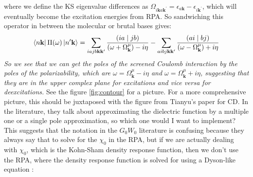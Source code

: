 \documentclass[12pt]{article}
\begin{document}
where we define the KS eigenvalue differences as \(\Omega_{i\mathbf{k}a\mathbf{k}^{\prime}} = \epsilon_{a\mathbf{k}} - \epsilon_{i\mathbf{k}^{\prime}}\), which will eventually become the excitation energies from RPA. So sandwiching this operator in between the molecular or brutal bases gives:
\begin{equation}
    \bra{n\mathbf{k}} \Pi (\omega) \ket{n^\prime\mathbf{k}} = \sum_{iajb \mathbf{k} \mathbf{k}^{\prime}} \frac{(ia\mid jb)}{(\omega + \Omega ^{\mu}_{\mathbf{k}})-i\eta} - \sum_{aibj \mathbf{k} \mathbf{k}^{\prime}} \frac{(ai\mid bj)}{(\omega - \Omega ^{\mu}_{\mathbf{k}})+i\eta}
\end{equation}
\emph{So we see that we can get the poles of the screened Coulomb interaction by the poles of the polarizability, which are \(\omega = \Omega ^{\mu}_{\mathbf{k}} - i\eta\) and \(\omega = \Omega ^{\mu}_{\mathbf{k}} + i\eta\), suggesting that they are in the upper complex plane for excitations and vice versa for deexcitations.} See the figure \ref{fig:contour} for a picture. For a more comprehensive picture, this should be juxtaposed with the figure from Tianyu's paper for CD. In the literature, they talk about approximating the dielectric function by a multiple one or a single pole approximation, so which one would I want to implement? This suggests that the notation in the \(G_0W_0\) literature is confusing because they always say that to solve for the \(\chi_0\) in the RPA, but if we are actually dealing with \(\chi_0\), which is the Kohn-Sham density response function, then we don't use the RPA, where the density response function is solved for using a Dyson-like equation \cite{Sander2015-xq}:
\end{document}
